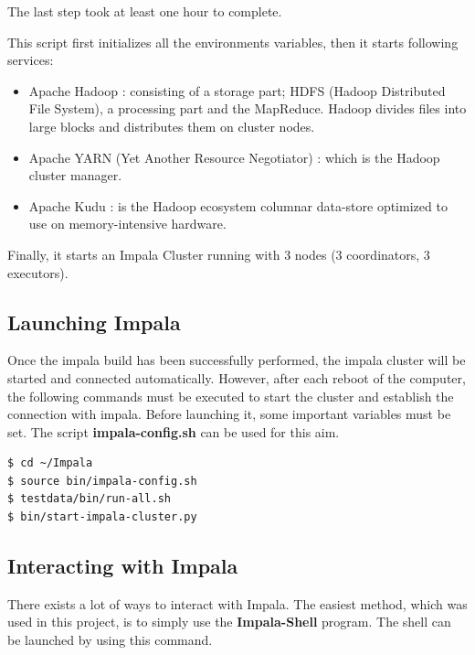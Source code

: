 \documentclass{article}
\begin{document}
The last step took at least one hour to complete.

This script first initializes all the environments variables, then it starts following services:

\begin{itemize}
\item Apache Hadoop : consisting of a storage part; HDFS (Hadoop Distributed File System), a processing part and the MapReduce. Hadoop divides files into large blocks and distributes them on cluster nodes.
\item Apache YARN (Yet Another Resource Negotiator) : which is the Hadoop cluster manager.
\item Apache Kudu : is the Hadoop ecosystem columnar data-store optimized to use on memory-intensive hardware.
\end{itemize}

Finally, it starts an Impala Cluster running with 3 nodes (3 coordinators, 3 executors).


\subsection{Launching Impala}
Once the impala build has been successfully performed, the impala cluster will be started and connected automatically. However, after each reboot of the computer, the following commands must be executed to start the cluster and establish the connection with impala. Before launching it, some important variables must be set. The script \textbf{impala-config.sh} can be used for this aim.

\vspace{0.5cm}
\begin{lstlisting}[language=bash]
$ cd ~/Impala
$ source bin/impala-config.sh
$ testdata/bin/run-all.sh
$ bin/start-impala-cluster.py
\end{lstlisting}

\subsection{Interacting with Impala}
There exists a lot of ways to interact with Impala. The easiest method, which was used in this project, is to simply use the \textbf{Impala-Shell} program. The shell can be launched by using this command.
\end{document}
